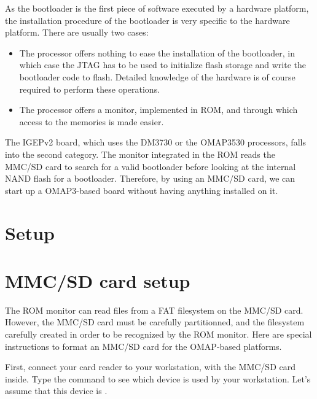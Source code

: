 
As the bootloader is the first piece of software executed by a
hardware platform, the installation procedure of the bootloader is
very specific to the hardware platform. There are usually two cases:

\begin{itemize}

\item The processor offers nothing to ease the installation of the
  bootloader, in which case the JTAG has to be used to initialize
  flash storage and write the bootloader code to flash. Detailed
  knowledge of the hardware is of course required to perform these
  operations.

\item The processor offers a monitor, implemented in ROM, and through
  which access to the memories is made easier.

\end{itemize}

The IGEPv2 board, which uses the DM3730 or the OMAP3530 processors, falls into
the second category. The monitor integrated in the ROM reads the MMC/SD
card to search for a valid bootloader before looking at the internal
NAND flash for a bootloader. Therefore, by using an MMC/SD card, we can
start up a OMAP3-based board without having anything installed on it.

\section{Setup}

\section{MMC/SD card setup}

The ROM monitor can read files from a FAT filesystem on the MMC/SD
card. However, the MMC/SD card must be carefully partitionned, and the
filesystem carefully created in order to be recognized by the ROM
monitor. Here are special instructions to format an MMC/SD card
for the OMAP-based platforms.

First, connect your card reader to your workstation, with the MMC/SD
card inside. Type the  command to see which device is used
by your workstation. Let's assume that this device is .

